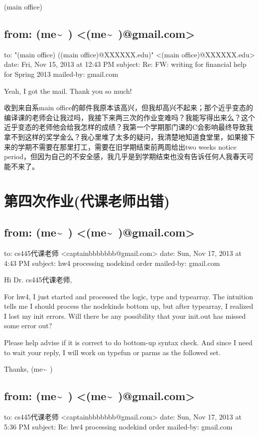 \documentclass[12pt]{book}
\begin{document}
(main office)


\section{from:         (me\textasciitilde{}~) <(me\textasciitilde{}~)@gmail.com>}
\label{sec-47-4}
to:         "(main office) ((main office)@XXXXXX.edu)" <(main office)@XXXXXX.edu>
date:         Fri, Nov 15, 2013 at 12:43 PM
subject:         Re: FW: writing for financial help for Spring 2013
mailed-by:         gmail.com

Yeah, I got the mail. Thank you so much!

收到来自系main office的邮件我原本该高兴，但我却高兴不起来；那个近乎变态的编译课的老师会让我过吗，我接下来两三次的作业变难吗？我能写得出来么？这个近乎变态的老师他会给我怎样的成绩？我第一个学期那门课的C会影响最终导致我拿不到这样的奖学金么？我心里堆了太多的疑问，我清楚地知道食堂里，如果接下来的学期不需要在那里打工，需要在旧学期结束前两周给出two weeks notice period，但因为自己的不安全感，我几乎是到学期结束也没有告诉任何人我春天可能不来了。

\chapter{第四次作业(代课老师出错)}
\label{sec-48}

\section{from:         (me\textasciitilde{}~) <(me\textasciitilde{}~)@gmail.com>}
\label{sec-48-1}
to:         cs445代课老师 <captainbbbbbbb@gmail.com>
date:         Sun, Nov 17, 2013 at 4:43 PM
subject:         hw4 processing nodekind order
mailed-by:         gmail.com

Hi Dr. cs445代课老师, 

For hw4, I just started and processed the logic, type and typearray. The intuition tells me I should process the nodekinds bottom up, but after typearray, I realized I lost my init errors. Will there be any possibility that your init.out has missed some error out?

Please help advise if it is correct to do bottom-up syntax check. And since I need to wait your reply, I will work on typefun or parms as the followed set. 

Thanks,
(me\textasciitilde{}~)


\section{from:         (me\textasciitilde{}~) <(me\textasciitilde{}~)@gmail.com>}
\label{sec-48-2}
to:         cs445代课老师 <captainbbbbbbb@gmail.com>
date:         Sun, Nov 17, 2013 at 5:36 PM
subject:         Re: hw4 processing nodekind order
mailed-by:         gmail.com
\end{document}
